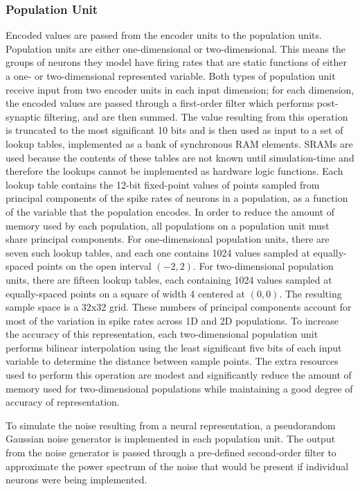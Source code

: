 \documentclass[english]{article}
\begin{document}
\subsubsection{Population Unit}

Encoded values are passed from the encoder units to the population units. 
Population units are either one-dimensional or two-dimensional.
This means the groups of neurons they model have firing rates that are static functions of either a one- or two-dimensional represented variable.
Both types of population unit receive input from two encoder units in each input dimension;
for each dimension, the encoded values are passed through a first-order filter which performs post-synaptic filtering,
and are then summed. The value resulting from this operation is
truncated to the most significant 10 bits and is then used as input to a set of lookup tables,
implemented as a bank of synchronous RAM elements. SRAMs are used
because the contents of these tables are not known until simulation-time and therefore the lookups cannot be implemented as hardware logic functions.
Each lookup table contains the 12-bit fixed-point values of points sampled from 
principal components of the spike rates of neurons in a population, as a function of the variable that the population encodes.
In order to reduce the amount of memory used by each population, all populations on a population unit must share principal components.
For one-dimensional population units, there are seven such lookup tables, and each one contains
1024 values sampled at equally-spaced points on the open interval $(-2, 2)$. For two-dimensional population units,
there are fifteen lookup tables, each containing 1024 values sampled at equally-spaced points on a square of width 4
centered at $(0, 0)$. The resulting sample space is a 32x32 grid.
These numbers of principal components account for most of the variation in spike rates across 1D and 2D populations.
To increase the accuracy of this representation, each two-dimensional population unit performs bilinear interpolation
using the least significant five bits of each input variable to determine the distance between sample points. 
The extra resources used to perform this operation are modest
and significantly reduce the amount of memory used for two-dimensional populations while maintaining a good degree of accuracy of representation.

To simulate the noise resulting from a neural representation, a pseudorandom Gaussian noise generator is implemented in each population unit.
The output from the noise generator is passed through a pre-defined second-order filter to approximate the power spectrum of the noise
that would be present if individual neurons were being implemented. %
\end{document}
